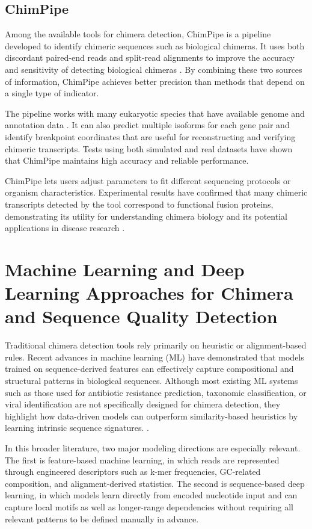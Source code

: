 \subsection{ChimPipe}
Among the available tools for chimera detection, ChimPipe is a pipeline developed to identify chimeric sequences such as biological chimeras. It uses both discordant paired-end reads and split-read alignments to improve the accuracy and sensitivity of detecting biological chimeras \citep{Rodriguez2017}. By combining these two sources of information, ChimPipe achieves better precision than methods that depend on a single type of indicator.

The pipeline works with many eukaryotic species that have available genome and annotation data \citep{Rodriguez2017}. It can also predict multiple isoforms for each gene pair and identify breakpoint coordinates that are useful for reconstructing and verifying chimeric transcripts. Tests using both simulated and real datasets have shown that ChimPipe maintains high accuracy and reliable performance.

ChimPipe lets users adjust parameters to fit different sequencing protocols or organism characteristics. Experimental results have confirmed that many chimeric transcripts detected by the tool correspond to functional fusion proteins, demonstrating its utility for understanding chimera biology and its potential applications in disease research \citep{Rodriguez2017}.

\section{Machine Learning and Deep Learning Approaches for Chimera and Sequence Quality Detection}
Traditional chimera detection tools rely primarily on heuristic or alignment-based rules. Recent advances in machine learning (ML) have demonstrated that models trained on sequence-derived features can effectively capture compositional and structural patterns in biological sequences. Although most existing ML systems such as those used for antibiotic resistance prediction, taxonomic classification, or viral identification are not specifically designed for chimera detection, they highlight how data-driven models can outperform similarity-based heuristics by learning intrinsic sequence signatures. \citep{Arango2018,Liang2020,Ren2020}.

In this broader literature, two major modeling directions are especially relevant. The first is feature-based machine learning, in which reads are represented through engineered descriptors such as k-mer frequencies, GC-related composition, and alignment-derived statistics. The second is sequence-based deep learning, in which models learn directly from encoded nucleotide input and can capture local motifs as well as longer-range dependencies without requiring all relevant patterns to be defined manually in advance.

